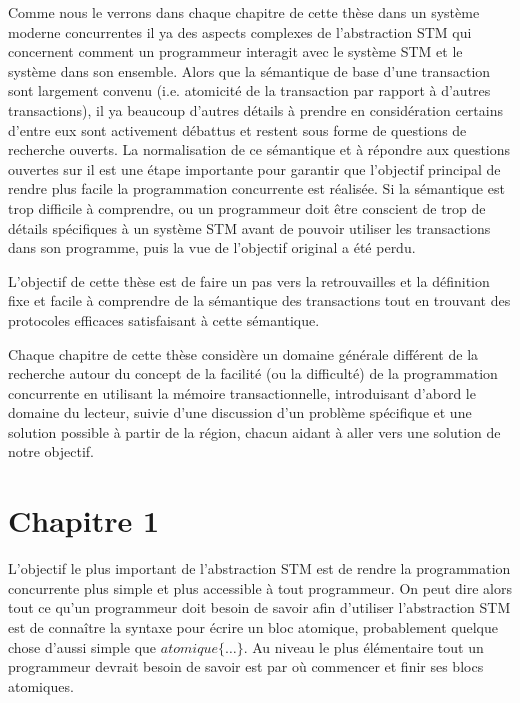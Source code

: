 Comme nous le verrons dans chaque chapitre de cette thèse dans un système moderne concurrentes
il ya des aspects complexes de l'abstraction STM qui concernent comment un programmeur interagit avec le système STM et le système dans son ensemble.
Alors que la sémantique de base d'une transaction sont largement convenu (i.e. atomicité de la transaction par rapport à d'autres transactions),
il ya beaucoup d'autres détails à prendre en considération certains d'entre eux sont activement débattus et restent sous forme de questions de recherche ouverts.
La normalisation de ce sémantique et à répondre aux questions ouvertes sur il est une étape importante pour garantir
que l'objectif principal de rendre plus facile la programmation concurrente est réalisée.
Si la sémantique est trop difficile à comprendre, ou un programmeur doit être conscient de trop de détails spécifiques à un système
STM avant de pouvoir utiliser les transactions dans son programme, puis la vue de l'objectif original a été perdu.



L'objectif de cette thèse est de faire un pas vers la retrouvailles et la définition fixe et facile à
comprendre de la sémantique des transactions tout en trouvant des protocoles efficaces satisfaisant à cette sémantique.



Chaque chapitre de cette thèse considère un domaine générale différent de la recherche autour du concept de la facilité
(ou la difficulté) de la programmation concurrente en utilisant la mémoire transactionnelle, introduisant d'abord le domaine du lecteur,
suivie d'une discussion d'un problème spécifique et une solution possible à partir de la région, chacun aidant à aller vers une solution de notre objectif.



\section{Chapitre 1}

L'objectif le plus important de l'abstraction STM est de rendre la programmation concurrente plus simple et plus accessible à tout programmeur.
On peut dire alors tout ce qu'un programmeur doit besoin de savoir afin d'utiliser l'abstraction STM est
de connaître la syntaxe pour écrire un bloc atomique, probablement quelque chose d'aussi simple que $atomique\{ \dots \}$.
Au niveau le plus élémentaire tout un programmeur devrait besoin de savoir est par où commencer et finir ses blocs atomiques.

